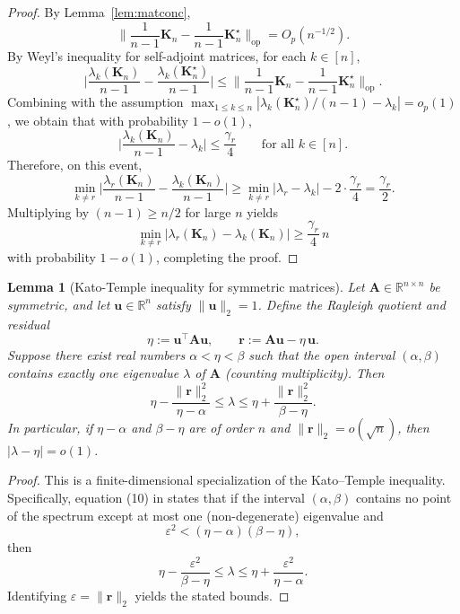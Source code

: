 \documentclass[11pt]{article}
\theoremstyle{plain}
\newtheorem{lemma}[theorem]{Lemma}
\theoremstyle{remark}
\newcommand{\op}{\mathrm{op}}
\begin{document}
\begin{proof}
By Lemma~\ref{lem:matconc},
\[
\Big\|\frac{1}{n-1}\mathbf{K}_n - \frac{1}{n-1}\mathbf{K}_n^\star\Big\|_{\op} = O_p(n^{-1/2}).
\]
By Weyl's inequality for self-adjoint matrices, for each $k\in[n]$,
\[
\Big|
\frac{\lambda_k(\mathbf{K}_n)}{n-1} - \frac{\lambda_k(\mathbf{K}_n^\star)}{n-1}
\Big|
\le
\Big\|\frac{1}{n-1}\mathbf{K}_n - \frac{1}{n-1}\mathbf{K}_n^\star\Big\|_{\op}.
\]
Combining with the assumption
$\max_{1\le k\le n}\left|\lambda_k(\mathbf K_n^\star)/(n-1)-\lambda_k\right|=o_p(1)$,
we obtain that with probability $1-o(1)$,
\[
\Big|
\frac{\lambda_k(\mathbf{K}_n)}{n-1} - \lambda_k
\Big|
\le \frac{\gamma_r}{4}
\qquad\text{for all }k\in[n].
\]
Therefore, on this event,
\[
\min_{k\neq r}
\Big|
\frac{\lambda_r(\mathbf{K}_n)}{n-1} - \frac{\lambda_k(\mathbf{K}_n)}{n-1}
\Big|
\ge
\min_{k\neq r}|\lambda_r-\lambda_k| - 2\cdot\frac{\gamma_r}{4}
=
\frac{\gamma_r}{2}.
\]
Multiplying by $(n-1)\ge n/2$ for large $n$ yields
\[
\min_{k\neq r}
|\lambda_r(\mathbf{K}_n) - \lambda_k(\mathbf{K}_n)|
\ge
\frac{\gamma_r}{4}\,n
\]
with probability $1-o(1)$, completing the proof.
\end{proof}







\begin{lemma}[Kato-Temple inequality for symmetric matrices]
\label{lem:kato-temple}
Let $\mathbf{A}\in\mathbb{R}^{n\times n}$ be symmetric, and let
$\mathbf{u}\in\mathbb{R}^n$ satisfy $\|\mathbf{u}\|_2=1$.
Define the Rayleigh quotient and residual
\[
\eta := \mathbf{u}^\top \mathbf{A}\mathbf{u},
\qquad
\mathbf{r} := \mathbf{A}\mathbf{u}-\eta\,\mathbf{u}.
\]
Suppose there exist real numbers $\alpha<\eta<\beta$ such that the open interval
$(\alpha,\beta)$ contains exactly one eigenvalue $\lambda$ of $\mathbf{A}$
(counting multiplicity).
Then
\[
\eta - \frac{\|\mathbf{r}\|_2^2}{\eta-\alpha}
\le
\lambda
\le
\eta + \frac{\|\mathbf{r}\|_2^2}{\beta-\eta}.
\]
In particular, if $\eta-\alpha$ and $\beta-\eta$ are of order $n$ and
$\|\mathbf{r}\|_2=o(\sqrt{n})$, then $|\lambda-\eta|=o(1)$.
\end{lemma}

\begin{proof}
This is a finite-dimensional specialization of the Kato--Temple inequality.
Specifically, equation (10) in \citet{Kato1949} states that if the interval
$(\alpha,\beta)$ contains no point of the spectrum except at most one
(non-degenerate) eigenvalue and
\[
\varepsilon^2 < (\eta-\alpha)(\beta-\eta),
\]
then
\[
\eta - \frac{\varepsilon^2}{\beta-\eta}
\le
\lambda
\le
\eta + \frac{\varepsilon^2}{\eta-\alpha}.
\]
Identifying $\varepsilon=\|\mathbf r\|_2$ yields the stated bounds.
\end{proof}
\end{document}
